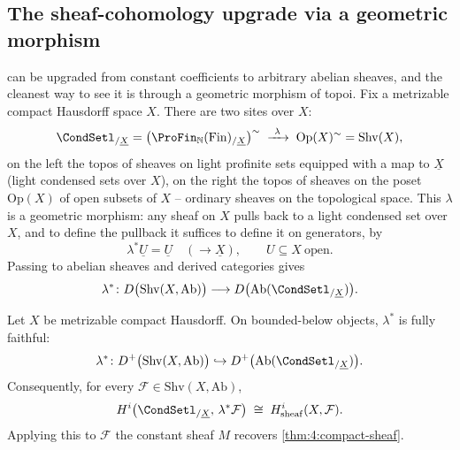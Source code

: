 \subsection{The sheaf-cohomology upgrade via a geometric morphism}

 can be upgraded from constant coefficients to
arbitrary abelian sheaves, and the cleanest way to see it is through a geometric
morphism of topoi. Fix a metrizable compact Hausdorff space $X$. There are two
sites over $X$:
\begin{equation*}
\CondSetl_{/\underline{X}}
=\bigl(\ProFin_{\mathbb{N}}(\mathrm{Fin})_{/\underline{X}}\bigr)^{\sim}
\;\xrightarrow{\ \lambda\ }\;
\mathrm{Op}(X)^{\sim}=\mathrm{Shv}(X),
\end{equation*}
on the left the topos of sheaves on light profinite sets equipped with a map to
$\underline{X}$ (light condensed sets over $X$), on the right the topos of
sheaves on the poset $\mathrm{Op}(X)$ of open subsets of $X$ -- ordinary
sheaves on the topological space. This $\lambda$ is a geometric morphism: any
sheaf on $X$ pulls back to a light condensed set over $X$, and to define the
pullback it suffices to define it on generators, by
\begin{equation*}
\lambda^{\ast}\underline{U}=\underline{U}\quad(\to\underline{X}),\qquad
U\subseteq X\ \text{open}.
\end{equation*}
Passing to abelian sheaves and derived categories gives
\begin{equation*}
\lambda^{\ast}\colon
D\bigl(\mathrm{Shv}(X,\mathrm{Ab})\bigr)\longrightarrow
D\bigl(\mathrm{Ab}(\CondSetl_{/\underline{X}})\bigr).
\end{equation*}

\begin{theorem}
\label{thm:4:lambda-fully-faithful}
Let $X$ be metrizable compact Hausdorff. On bounded-below objects, $\lambda^\ast$
is fully faithful:
\[
\lambda^{\ast}\colon D^{+}\bigl(\mathrm{Shv}(X,\mathrm{Ab})\bigr)
\hookrightarrow D^{+}\bigl(\mathrm{Ab}(\CondSetl_{/\underline{X}})\bigr).
\]
Consequently, for every $\mathcal{F}\in\mathrm{Shv}(X,\mathrm{Ab})$,
\begin{equation*}
H^{i}\bigl(\CondSetl_{/\underline{X}},\,\lambda^{\ast}\mathcal{F}\bigr)
\;\cong\;
H^{i}_{\mathrm{sheaf}}(X,\mathcal{F}).
\end{equation*}
Applying this to $\mathcal{F}$ the constant sheaf $M$ recovers
\cref{thm:4:compact-sheaf}.
\end{theorem}

